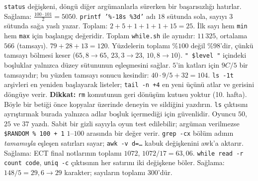 \documentclass[11pt,a4paper]{article}
\newcommand{\cmd}[1]{\texttt{#1}}
\begin{document}
\texttt{status} değişkeni, döngü diğer argümanlarla sürerken bir başarısızlığı hatırlar.
Sağlama: $\frac{100 \cdot 101}{2} = 5050$.
\texttt{printf '\%-18s \%3d'} adı $18$ sütunda sola, sayıyı $3$ sütunda sağa yaslı yazar. Toplam: $2 + 5 + 1 + 1 + 1 + 15 = 25$.
İlk sayı hem \texttt{min} hem \texttt{max} için başlangıç değeridir. Toplam \texttt{while.sh} ile aynıdır: $11\,325$, ortalama $566$ (tamsayı).
$79 + 28 + 13 = 120$. Yüzdelerin toplamı \%$100$ değil \%$98$'dir, çünkü tamsayı bölmesi keser ($65{,}8 \to 65$, $23{,}3 \to 23$, $10{,}8 \to 10$). \texttt{" \$level "} içindeki boşluklar yalnızca düzey sütununun eşleşmesini sağlar.
$5$'in katları için $9C/5$ bir tamsayıdır; bu yüzden tamsayı sonucu kesindir: $40 \cdot 9 / 5 + 32 = 104$.
\cmd{ls -1t} arşivleri en yeniden başlayarak listeler; \cmd{tail -n +4} en yeni üçünü atlar ve gerisini döngüye verir. \textbf{Dikkat:} \cmd{rm} komutunun geri dönüşüm kutusu yoktur (10. hafta). Böyle bir betiği önce kopyalar üzerinde deneyin ve sildiğini yazdırın. \cmd{ls} çıktısını ayrıştırmak burada yalnızca adlar boşluk içermediği için güvenlidir.
Oyuncu $50$, $25$ ve $37$ yazdı. Sabit bir gizli sayıyla oyun test edilebilir; argüman verilmezse \texttt{\$RANDOM \% 100 + 1} $1$--$100$ arasında bir değer verir.
\cmd{grep -cx} bölüm adının \emph{tamamıyla} eşleşen satırları sayar; \texttt{awk -v d=\ldots} kabuk değişkenini awk'a aktarır. Sağlama: ECT final notlarının toplamı $1072$, $1072/17 = 63{,}06$.
\texttt{while read -r count code}, \cmd{uniq -c} çıktısının her satırını iki değişkene böler. Sağlama: $148/5 = 29{,}6 \to 29$ karakter; sayıların toplamı $300$'dür.
\end{document}
